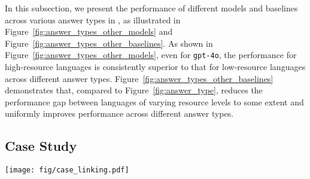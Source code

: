 \begin{figure*}[t]
    \centering
    \begin{subfigure}[b]{0.48\linewidth}
        \centering
        
    \end{subfigure}
    \hfill %
    \begin{subfigure}[b]{0.48\linewidth}
        \centering
        
    \end{subfigure}
    \vspace{-1em}
    \caption{
        The left part is the EM of En-CoT across different answer types on \ourdataset using Llama3.1-70B.
        The right part is the EM of En-PoT across different answer types on \ourdataset using Llama3.1-70B.
    } 
    \label{fig:answer_types_other_baselines}
    \vspace{-1em}
\end{figure*}

In this subsection, we present the performance of different models and baselines across various answer types in \ourdataset, as illustrated in Figure~\ref{fig:answer_types_other_models} and Figure~\ref{fig:answer_types_other_baselines}.
As shown in Figure~\ref{fig:answer_types_other_models}, even for \texttt{gpt-4o}, the performance for high-resource languages is consistently superior to that for low-resource languages across different answer types.
Figure~\ref{fig:answer_types_other_baselines} demonstrates that, compared to Figure~\ref{fig:answer_type}, \ourmethod reduces the performance gap between languages of varying resource levels to some extent and uniformly improves performance across different answer types.


\subsection{Case Study}
\label{subsec:case study}

\begin{figure*}[t]
    \centering
    \texttt{[image: fig/case\_linking.pdf]}
    \caption{
    The case for the error type of "Linking".
    }
    \label{fig:case_linking}
\end{figure*}


